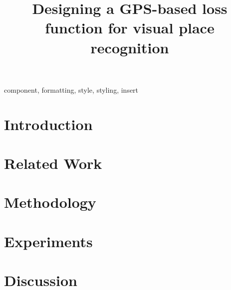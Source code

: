 \documentclass[conference]{IEEEtran}
\begin{document}
\title{Designing a GPS-based loss function for visual place recognition}

\author{
}

\maketitle

\begin{abstract}

\end{abstract}

\begin{IEEEkeywords}
component, formatting, style, styling, insert
\end{IEEEkeywords}

\section{Introduction}



\section{Related Work}


\section{Methodology}


\section{Experiments}


\section{Discussion}
\end{document}
